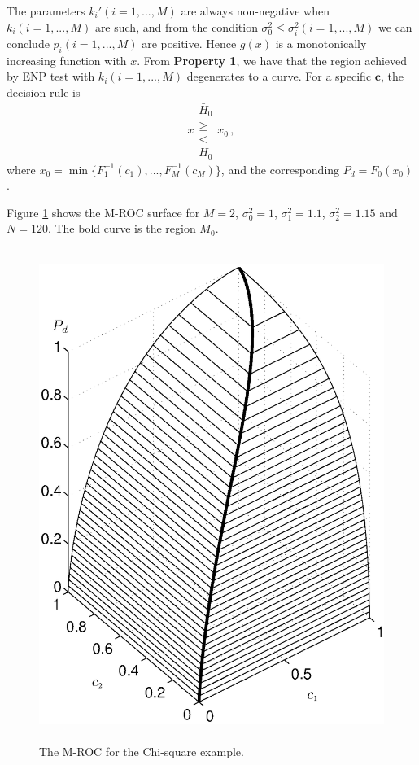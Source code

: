 The parameters $k_i' (i=1, ..., M)$ are always non-negative when $k_i (i=1, ..., M)$ are such, and from 
 the condition $\sigma_0^2 \leq \sigma_i^2 (i=1, ..., M)$ we can conclude $p_i (i=1, ..., M)$ are positive. Hence $g(x)$ is a monotonically increasing function with $x$. From \textbf{Property 1}, we have that the region achieved by ENP test with $k_i (i = 1, ..., M)$ degenerates to a curve. For a specific $\mathbf{c}$, the decision rule is
\begin{equation}
  \label{equ: decision rule chi 2}
  x \substack{\bar{H}_0 \\ \geq \\ < \\ H_0} x_0\,,
\end{equation}
where $x_0 = \min\{F_1^{-1}(c_1), ..., F_M^{-1}(c_M)\}$,
and the corresponding $P_d = F_0(x_0)$. 

Figure \ref{pic: LJS for chisquare} shows the M-ROC surface for $M=2$, $\sigma_0^2 = 1$, $\sigma_1^2 = 1.1$, $\sigma_2^2 = 1.15$ and $N=120$. The bold curve  is the region $M_0$. 

\begin{figure}[!t]
\centering
\includegraphics[width=12cm, height=16cm]{3/example3.eps}
\caption{The M-ROC for the Chi-square example.}
\label{pic: LJS for chisquare}
\end{figure}
